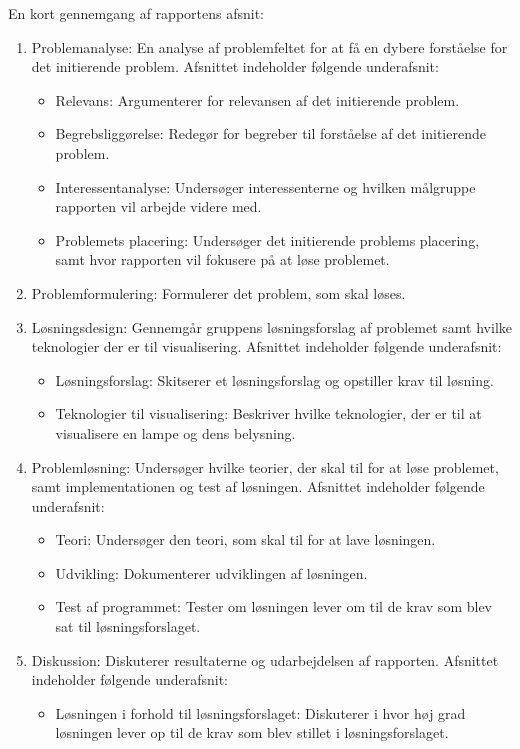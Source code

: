En kort gennemgang af rapportens afsnit:
\begin{enumerate}
\item Problemanalyse: En analyse af problemfeltet for at få en dybere forståelse for det initierende problem. Afsnittet indeholder følgende underafsnit:
  \begin{itemize}
    \item Relevans: Argumenterer for relevansen af det initierende problem.
    \item Begrebsliggørelse: Redegør for begreber til forståelse af det initierende problem.
    \item Interessentanalyse: Undersøger interessenterne og hvilken målgruppe rapporten vil arbejde videre med.
    \item Problemets placering: Undersøger det initierende problems placering, samt hvor rapporten vil fokusere på at løse problemet.
  \end{itemize}
\item Problemformulering: Formulerer det problem, som skal løses.
\item Løsningsdesign: Gennemgår gruppens løsningsforslag af problemet samt hvilke teknologier der er til visualisering. Afsnittet indeholder følgende underafsnit: 
  \begin{itemize}
    \item Løsningsforslag: Skitserer et løsningsforslag og opstiller krav til løsning.
    \item Teknologier til visualisering: Beskriver hvilke teknologier, der er til at visualisere en lampe og dens belysning.
  \end{itemize}
\item Problemløsning: Undersøger hvilke teorier, der skal til for at løse problemet, samt implementationen og test af løsningen. Afsnittet indeholder følgende underafsnit:
  \begin{itemize}
    \item Teori: Undersøger den teori, som skal til for at lave løsningen.
    \item Udvikling: Dokumenterer udviklingen af løsningen.
    \item Test af programmet: Tester om løsningen lever om til de krav som blev sat til løsningsforslaget.
  \end{itemize}
\item Diskussion: Diskuterer resultaterne og udarbejdelsen af rapporten. Afsnittet indeholder følgende underafsnit:
  \begin{itemize}
    \item Løsningen i forhold til løsningsforslaget: Diskuterer i hvor høj grad løsningen lever op til de krav som blev stillet i løsningsforslaget.

\end{itemize}
\end{enumerate}
